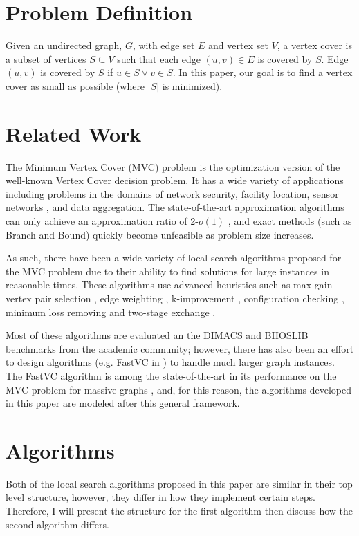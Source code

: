 \documentclass[sigconf]{acmart}
\begin{document}
\section{Problem Definition}
Given an undirected graph, $G$, with edge set $E$ and vertex set $V$, a vertex cover is a subset of vertices $S \subseteq V$ such that each edge $(u,v) \in E$ is covered by $S$. Edge $(u,v)$ is covered by $S$ if $u \in S \vee v \in S$. In this paper, our goal is to find a vertex cover as small as possible (where $|S|$ is minimized). 

\section{Related Work}
The Minimum Vertex Cover (MVC) problem is the optimization version of the well-known Vertex Cover decision problem. It has a wide variety of applications including problems in the domains of network security, facility location, sensor networks \cite{kavalci2014}, and data aggregation. The state-of-the-art approximation algorithms can only achieve an approximation ratio of 2-$o(1)$ \cite{halperin_2002}, and exact methods (such as Branch and Bound) quickly become unfeasible as problem size increases.

As such, there have been a wide variety of local search algorithms proposed for the MVC problem due to their ability to find solutions for large instances in reasonable times. These algorithms use advanced heuristics such as max-gain vertex pair selection \cite{richter_helmert_gretton}, edge weighting \cite{richter_helmert_gretton, cai2010}, k-improvement \cite{andrade_resende_werneck}, configuration checking \cite{cai_su_sattar_2011}, minimum loss removing and two-stage exchange \cite{cai2013numvc}. 

Most of these algorithms are evaluated an the DIMACS and BHOSLIB benchmarks from the academic community; however, there has also been an effort to design algorithms (e.g. FastVC in \cite{cai2015fastvc}) to handle much larger graph instances. The FastVC algorithm is among the state-of-the-art in its performance on the MVC problem for massive graphs \cite{cai2015fastvc}, and, for this reason, the algorithms developed in this paper are modeled after this general framework.

\section{Algorithms}
Both of the local search algorithms proposed in this paper are similar in their top level structure, however, they differ in how they implement certain steps. Therefore, I will present the structure for the first algorithm then discuss how the second algorithm differs.
\end{document}
